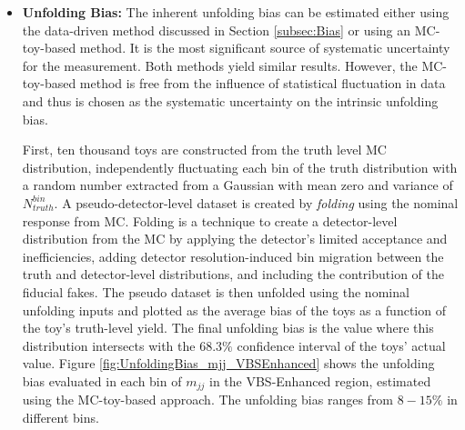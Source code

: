 \begin{itemize}
    \item{\textbf{Unfolding Bias:} The inherent unfolding bias can be estimated either using the data-driven method discussed in Section \ref{subsec:Bias} or using an MC-toy-based method. It is the most significant source of systematic uncertainty for the measurement. Both methods yield similar results. However, the MC-toy-based method is free from the influence of statistical fluctuation in data and thus is chosen as the systematic uncertainty on the intrinsic unfolding bias. 

    First, ten thousand toys are constructed from the truth level MC distribution, independently fluctuating each bin of the truth distribution with a random number extracted from a Gaussian with mean zero and variance of $N_{truth}^{bin}$. A pseudo-detector-level dataset is created by \textit{folding} using the nominal response from MC. Folding is a technique to create a detector-level distribution from the MC by applying the detector's limited acceptance and inefficiencies, adding detector resolution-induced bin migration between the truth and detector-level distributions, and including the contribution of the fiducial fakes. The pseudo dataset is then unfolded using the nominal unfolding inputs and plotted as the average bias of the toys as a function of the toy's truth-level yield. The final unfolding bias is the value where this distribution intersects with the $68.3\%$ confidence interval of the toys' actual value. Figure \ref{fig:UnfoldingBias_mjj_VBSEnhanced} shows the unfolding bias evaluated in each bin of $m_{jj}$ in the VBS-Enhanced region, estimated using the MC-toy-based approach. The unfolding bias ranges from $8-15\%$ in different bins.%

}
\end{itemize}

